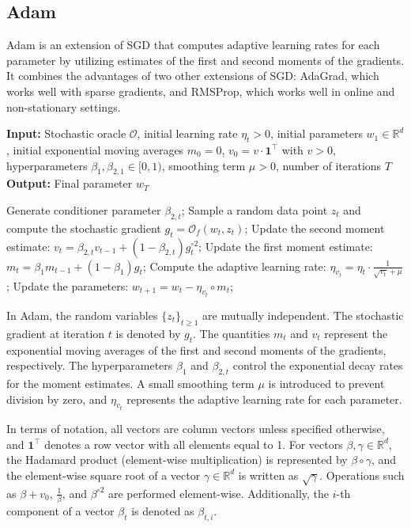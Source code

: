 \documentclass{article} %
\begin{document}
\subsection{Adam}
Adam is an extension of SGD that computes adaptive learning rates for each parameter by utilizing estimates of the first and second moments of the gradients. It combines the advantages of two other extensions of SGD: AdaGrad, which works well with sparse gradients, and RMSProp, which works well in online and non-stationary settings.

\begin{algorithm}[H]\label{Adam}
\caption{Adam}
\textbf{Input:} Stochastic oracle \( \mathcal{O} \), initial learning rate \( \eta_{t} >0 \), initial parameters \( w_1 \in \mathbb{R}^d \), initial exponential moving averages \( m_0 = 0 \), \( v_0 = v \cdot \mathbf{1}^\top \) with \( v > 0 \), hyperparameters \( \beta_1, \beta_{2,1} \in [0,1) \), smoothing term \( \mu > 0 \), number of iterations \( T \)\\
\textbf{Output:} Final parameter \( w_T \)
\begin{algorithmic}[1]
    \State Generate conditioner parameter \( \beta_{2,t} \);
    \State Sample a random data point \( z_t \) and compute the stochastic gradient \( g_t = \mathcal{O}_f(w_t, z_t) \);
    \State Update the second moment estimate: \( v_t = \beta_{2,t} v_{t-1} + (1 - \beta_{2,t}) g_t^{\circ 2} \);
    \State Update the first moment estimate: \( m_t = \beta_{1} m_{t-1} + (1 - \beta_{1}) g_t \);
    \State Compute the adaptive learning rate: \( \eta_{v_{t}} = \eta_{t} \cdot \frac{1}{\sqrt{v_{t}} + \mu} \);
    \State Update the parameters: \( w_{t+1} = w_t - \eta_{v_{t}} \circ m_t \);
\EndFor
\end{algorithmic}
\end{algorithm}

In Adam, the random variables \( \{z_t\}_{t\ge 1} \) are mutually independent. The stochastic gradient at iteration \( t \) is denoted by \( g_t \). The quantities \( m_t \) and \( v_t \) represent the exponential moving averages of the first and second moments of the gradients, respectively. The hyperparameters \( \beta_1 \) and \( \beta_{2,t} \) control the exponential decay rates for the moment estimates. A small smoothing term \( \mu \) is introduced to prevent division by zero, and \( \eta_{v_t} \) represents the adaptive learning rate for each parameter.

In terms of notation, all vectors are column vectors unless specified otherwise, and \( \mathbf{1}^\top \) denotes a row vector with all elements equal to 1. For vectors \( \beta, \gamma \in \mathbb{R}^d \), the Hadamard product (element-wise multiplication) is represented by \( \beta \circ \gamma \), and the element-wise square root of a vector \( \gamma \in \mathbb{R}^d \) is written as \( \sqrt{\gamma} \). Operations such as \( \beta + v_0 \), \( \frac{1}{\beta} \), and \( \beta^{\circ 2} \) are performed element-wise. Additionally, the \( i \)-th component of a vector \( \beta_t \) is denoted as \( \beta_{t,i} \).
\end{document}
